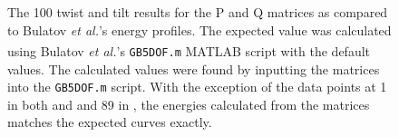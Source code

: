 \documentclass[12pt]{report}
\begin{document}
\begin{figure}[ht!]
 \centering
 
 \quad
 \caption{\label{fig:compare100} The \textlangle{}100\textrangle{} twist \protect{} and tilt \protect{} results for the P and Q matrices as compared to Bulatov \emph{et al.}'s energy profiles. The expected value was calculated using Bulatov \emph{et al.}'s \lstinline!GB5DOF.m! MATLAB\textsuperscript{\textregistered} script with the default values.  The calculated values were found by inputting the matrices into the \lstinline!GB5DOF.m! script. With the exception of the data points at 1\textdegree{} in both \protect{} and \protect{} and 89\textdegree{} in \protect{}, the energies calculated from the matrices matches the expected curves exactly.}
\end{figure}
\end{document}
